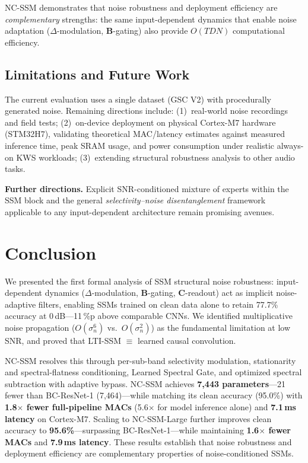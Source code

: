 \documentclass[journal]{IEEEtran}
\begin{document}
NC-SSM demonstrates that noise robustness and deployment efficiency are \emph{complementary} strengths: the same input-dependent dynamics that enable noise adaptation ($\Delta$-modulation, $\mathbf{B}$-gating) also provide $O(TDN)$ computational efficiency.

\subsection{Limitations and Future Work}
\label{sec:limitations}

The current evaluation uses a single dataset (GSC V2) with procedurally generated noise.
Remaining directions include:
(1)~real-world noise recordings and field tests;
(2)~on-device deployment on physical Cortex-M7 hardware (STM32H7), validating theoretical MAC/latency estimates against measured inference time, peak SRAM usage, and power consumption under realistic always-on KWS workloads;
(3)~extending structural robustness analysis to other audio tasks.

\smallskip\noindent\textbf{Further directions.}
Explicit SNR-conditioned mixture of experts within the SSM block and the general \emph{selectivity--noise disentanglement} framework applicable to any input-dependent architecture remain promising avenues.


\section{Conclusion}
\label{sec:conclusion}

We presented the first formal analysis of SSM structural noise robustness: input-dependent dynamics ($\Delta$-modulation, $\mathbf{B}$-gating, $\mathbf{C}$-readout) act as implicit noise-adaptive filters, enabling SSMs trained on clean data alone to retain 77.7\% accuracy at 0\,dB---11\,\%p above comparable CNNs.
We identified multiplicative noise propagation ($O(\sigma_n^6)$ vs.\ $O(\sigma_n^2)$) as the fundamental limitation at low SNR, and proved that LTI-SSM $\equiv$ learned causal convolution.

NC-SSM resolves this through per-sub-band selectivity modulation, stationarity and spectral-flatness conditioning, Learned Spectral Gate, and optimized spectral subtraction with adaptive bypass.
NC-SSM achieves \textbf{7{,}443 parameters}---21 fewer than BC-ResNet-1 (7{,}464)---while matching its clean accuracy (95.0\%) with \textbf{1.8$\times$ fewer full-pipeline MACs} (5.6$\times$ for model inference alone) and \textbf{7.1\,ms latency} on Cortex-M7.
Scaling to NC-SSM-Large further improves clean accuracy to \textbf{95.6\%}---surpassing BC-ResNet-1---while maintaining \textbf{1.6$\times$ fewer MACs} and \textbf{7.9\,ms latency}.
These results establish that noise robustness and deployment efficiency are complementary properties of noise-conditioned SSMs.
\end{document}
